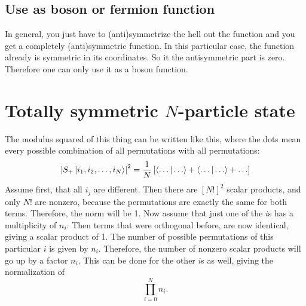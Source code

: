 \documentclass[11pt, english, fleqn, DIV=15, headinclude, BCOR=1.5cm]{scrartcl}
\begin{document}

\subsection{Use as boson or fermion function}

In general, you just have to (anti)symmetrize the hell out the function and you
get a completely (anti)symmetric function. In this particular case, the
function already is symmetric in its coordinates. So it the antisymmetric part
is zero. Therefore one can only use it as a boson function.

\section{Totally symmetric $N$-particle state}

The modulus squared of this thing can be written like this, where the dots mean
every possible combination of all permutations with all permutations:
\[
    \left| S_+ \ket{i_1, i_2, \ldots, i_N} \right|^2
    = \frac{1}{N} \left[ 
        \braket{\ldots | \ldots}
        +
        \braket{\ldots | \ldots}
        +
        \ldots
     \right]
\]
Assume first, that all $i_j$ are different. Then there are $[N!]^2$ scalar
products, and only $N!$ are nonzero, because the permutations are exactly the
same for both terms. Therefore, the norm will be 1. Now assume that just one of
the $i$s has a multiplicity of $n_i$. Then terms that were orthogonal before,
are now identical, giving a scalar product of 1. The number of possible
permutations of this particular $i$ is given by $n_i$. Therefore, the number of
nonzero scalar products will go up by a factor $n_i$. This can be done for the
other $i$s as well, giving the normalization of
\[
    \prod_{i = 0}^N n_i.
\]
\end{document}

